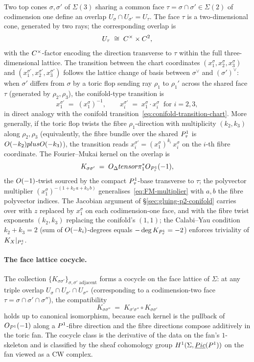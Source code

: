 Two top cones $\sigma, \sigma'$ of $\Sigma(3)$ sharing a common face
$\tau = \sigma \cap \sigma' \in \Sigma(2)$ of codimension one define an
overlap $U_\sigma \cap U_{\sigma'} = U_\tau$.  The face $\tau$ is a
two-dimensional cone, generated by two rays; the corresponding overlap is
\[
  U_\tau \;\cong\; C^\times \times C^2,
\]
with the $C^\times$-factor encoding the direction transverse to $\tau$
within the full three-dimensional lattice.  The transition between the chart coordinates
$(x_1^\sigma, x_2^\sigma, x_3^\sigma)$ and $(x_1^{\sigma'}, x_2^{\sigma'},
x_3^{\sigma'})$ follows the lattice change of basis between $\sigma^\vee$
and $(\sigma')^\vee$: when $\sigma'$ differs from $\sigma$ by a toric flop
sending ray $\rho_1$ to $\rho_1'$ across the shared face $\tau$ (generated
by $\rho_2, \rho_3$), the conifold-type transition is
\begin{equation}\label{eq:multi-chart-transition}
  x_1^{\sigma'} \;=\; (x_1^\sigma)^{-1},
  \qquad
  x_i^{\sigma'} \;=\; x_1^\sigma \cdot x_i^\sigma
  \;\; \text{for } i = 2, 3,
\end{equation}
in direct analogy with the conifold
transition~\eqref{eq:conifold-transition-chart}.  More generally, if the
toric flop twists the fibre $\rho_1$-direction with multiplicity $(k_2, k_3)$
along $\rho_2, \rho_3$ (equivalently, the fibre bundle over the shared
$P^1_\tau$ is $O(-k_2) plus O(-k_3)$), the transition reads
$x_i^{\sigma'} = (x_1^\sigma)^{k_i}\, x_i^\sigma$ on the $i$-th fibre
coordinate.  The Fourier--Mukai kernel on the overlap is
\[
  K_{\sigma \sigma'} \;=\; O_\Delta tensor \pi_1^* O_{P^1_{\tau}}(-1),
\]
the $O(-1)$-twist sourced by the compact $P^1_\tau$-base transverse
to $\tau$; the polyvector multiplier
$(x_1^\sigma)^{-(1 + k_2\, a + k_3\, b)}$ generalises~\eqref{eq:FM-multiplier}
with $a, b$ the fibre polyvector indices.  The Jacobian
argument of \S\ref{sec:gluing-p2-conifold} carries over with $z$ replaced
by $x_1^\sigma$ on each codimension-one face, and with the fibre twist
exponents $(k_2, k_3)$ replacing the conifold's $(1, 1)$; the
Calabi--Yau condition $k_2 + k_3 = 2$ (sum of $O(-k_i)$-degrees equals
$-\deg K_{P^1_\tau} = -2$) enforces triviality of
$K_{X}|_{P^1_\tau}$.

\paragraph{The face lattice cocycle.}
The collection $\{K_{\sigma \sigma'}\}_{\sigma, \sigma' \text{ adjacent}}$
forms a cocycle on the face lattice of $\Sigma$: at any triple overlap
$U_\sigma \cap U_{\sigma'} \cap U_{\sigma''}$ (corresponding to a
codimension-two face $\tau = \sigma \cap \sigma' \cap \sigma''$), the
compatibility
\[
  K_{\sigma \sigma''} \;=\; K_{\sigma' \sigma''} \circ K_{\sigma \sigma'}
\]
holds up to canonical isomorphism, because each kernel is the pullback of
$O_{P^1}(-1)$ along a $P^1$-fibre direction and the fibre directions
compose additively in the toric fan.  The cocycle class is the derivative
of the data on the fan's $1$-skeleton and is classified by the sheaf
cohomology group $H^1(\Sigma, \underline{Pic}(P^1))$ on the fan
viewed as a CW complex.

